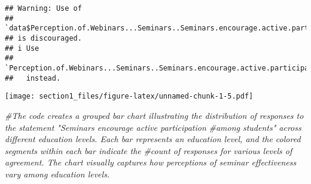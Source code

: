 \documentclass[
]{article}
\newenvironment{Shaded}{\begin{snugshade}}{\end{snugshade}}
\newcommand{\CommentTok}[1]{\textcolor[rgb]{0.56,0.35,0.01}{\textit{#1}}}
\begin{document}
\begin{verbatim}
## Warning: Use of
## `data$Perception.of.Webinars...Seminars..Seminars.encourage.active.participation.among.students..`
## is discouraged.
## i Use
##   `Perception.of.Webinars...Seminars..Seminars.encourage.active.participation.among.students..`
##   instead.
\end{verbatim}

\texttt{[image: section1\_files/figure-latex/unnamed-chunk-1-5.pdf]}

\begin{Shaded}
\begin{Highlighting}[]
\CommentTok{\#The code creates a grouped bar chart illustrating the distribution of responses to the statement "Seminars encourage active participation }
\CommentTok{\#among students" across different education levels. Each bar represents an education level, and the colored segments within each bar indicate the }
\CommentTok{\#count of responses for various levels of agreement. The chart visually captures how perceptions of seminar effectiveness vary among education levels.}
\end{Highlighting}
\end{Shaded}
\end{document}
